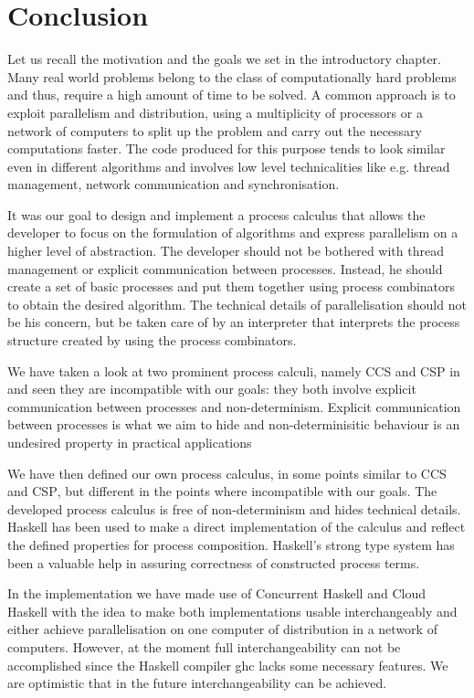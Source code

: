 \chapter{Conclusion}
Let us recall the motivation and the goals we set in the introductory chapter. Many real world problems belong to the class of computationally hard problems and thus, require a high amount of time to be solved. A common approach is to exploit parallelism and distribution, using a multiplicity of processors or a network of computers to split up the problem and carry out the necessary computations faster. The code produced for this purpose tends to look similar even in different algorithms and involves low level technicalities like e.g. thread management, network communication and synchronisation.

It was our goal to design and implement a process calculus that allows the developer to focus on the formulation of algorithms and express parallelism on a higher level of abstraction. The developer should not be bothered with thread management or explicit communication between processes. Instead, he should create a set of basic processes and put them together using process combinators to obtain the desired algorithm. The technical details of parallelisation should not be his concern, but be taken care of by an interpreter that interprets the process structure created by using the process combinators.

We have taken a look at two prominent process calculi, namely \textsc{CCS} and \textsc{CSP} in  and seen they are incompatible with our goals: they both involve explicit communication between processes and non-determinism. Explicit communication between processes is what we aim to hide and non-determinisitic behaviour is an undesired property in practical applications

We have then defined our own process calculus, in some points similar to \textsc{CCS} and \textsc{CSP}, but different in the points where incompatible with our goals. The developed process calculus is free of non-determinism and hides technical details. \textsf{Haskell} has been used to make a direct implementation of the calculus and reflect the defined properties for process composition. \textsf{Haskell}'s strong type system has been a valuable help in assuring correctness of constructed process terms.

In the implementation we have made use of \textsf{Concurrent Haskell} and \textsf{Cloud Haskell} with the idea to make both implementations usable interchangeably and either achieve parallelisation on one computer of distribution in a network of computers. However, at the moment full interchangeability can not be accomplished since the \textsf{Haskell} compiler \textsf{ghc} lacks some necessary features. We are optimistic that in the future interchangeability can be achieved.

